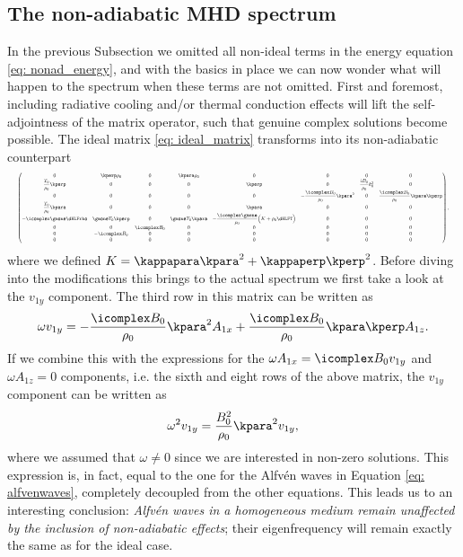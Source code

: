 \subsection{The non-adiabatic MHD spectrum}
In the previous Subsection we omitted all non-ideal terms in the energy equation \eqref{eq: nonad_energy}, and with the basics in place we can now wonder what will happen to the spectrum when these terms are not omitted. First and foremost, including radiative cooling and/or thermal conduction effects will lift the self-adjointness of the matrix operator, such that genuine complex solutions become possible. The ideal matrix \eqref{eq: ideal_matrix} transforms into its non-adiabatic counterpart
\begin{equation} \label{eq: nonadiabatic_matrix}
  \resizebox{\hsize}{!}{$
    \begin{pmatrix}
      0 & \kperp \rho_0 & 0 & \kpara \rho_0 & 0 & 0 & 0 & 0 \\
      \dfrac{T_0}{\rho_0}\kperp & 0 & 0 & 0 & \kperp & 0 & \dfrac{i B_0}{\rho_0}k_0^2 & 0 \\
      0 & 0 & 0 & 0 & 0 & -\dfrac{\icomplex B_0}{\rho_0}\kpara^2 & 0 & \dfrac{\icomplex B_0}{\rho_0}\kpara \kperp \\
      \dfrac{T_0}{\rho_0}\kpara & 0 & 0 & 0 & \kpara & 0 & 0 & 0 \\
      -\icomplex\gmone \dHLFrho &
        \gmone T_0 \kperp &
        0 &
        \gmone T_0 \kpara &
        -\dfrac{\icomplex\gmone}{\rho_0}\Bigl(K + \rho_0 \dHLFT\Bigr) &
        0 &
        0 &
        0 \\
      0 & 0 & \icomplex B_0 & 0 & 0 & 0 & 0 & 0 \\
      0 & -\icomplex B_0 & 0 & 0 & 0 & 0 & 0 & 0 \\
      0 & 0 & 0 & 0 & 0 & 0 & 0 & 0
    \end{pmatrix},
  $}
\end{equation}
where we defined $K = \kappapara \kpara^2 + \kappaperp \kperp^2$. Before diving into the modifications this brings to the actual spectrum we first take a look at the $v_{1y}$ component. The third row in this matrix can be written as
\begin{equation}
  \omega v_{1y} = -\frac{\icomplex B_0}{\rho_0}\kpara^2 A_{1x} + \frac{\icomplex B_0}{\rho_0}\kpara\kperp A_{1z}.
\end{equation}
If we combine this with the expressions for the $\omega A_{1x} = \icomplex B_0 v_{1y}$ and $\omega A_{1z} = 0$ components, i.e. the sixth and eight rows of the above matrix, the $v_{1y}$ component can be written as
\begin{equation}
  \omega^2 v_{1y} = \frac{B_0^2}{\rho_0}\kpara^2 v_{1y},
\end{equation}
where we assumed that $\omega \neq 0$ since we are interested in non-zero solutions. This expression is, in fact, equal to the one for the Alfv\'en waves in Equation \eqref{eq: alfvenwaves}, completely decoupled from the other equations. This leads us to an interesting conclusion: \emph{Alfv\'en waves in a homogeneous medium remain unaffected by the inclusion of non-adiabatic effects}; their eigenfrequency will remain exactly the same as for the ideal case.

